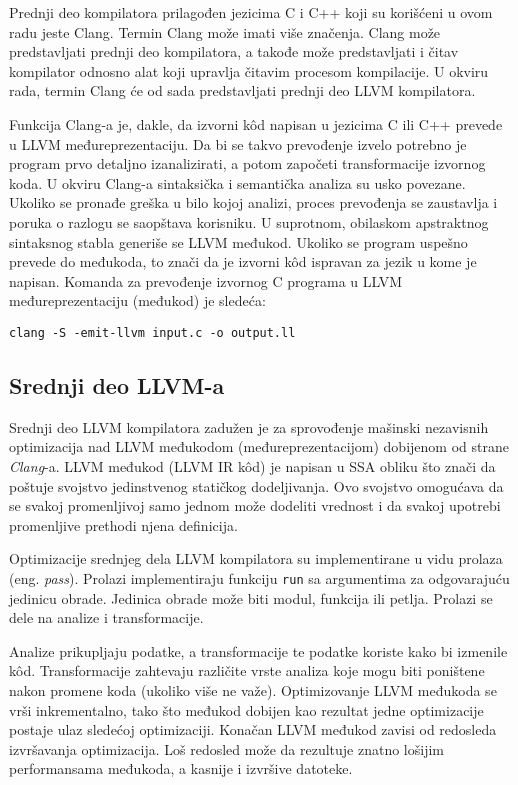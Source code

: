 \documentclass[12pt,oneside]{memoir}
\begin{document}
Prednji deo kompilatora prilagođen jezicima C i C++ koji su korišćeni u ovom radu jeste Clang. Termin Clang može imati više značenja. Clang može predstavljati prednji deo kompilatora, a takođe može predstavljati i čitav kompilator odnosno alat koji upravlja čitavim procesom kompilacije. U okviru rada, termin Clang će od sada predstavljati prednji deo LLVM kompilatora. 

Funkcija Clang-a je, dakle, da izvorni kôd napisan u jezicima C ili C++ prevede u LLVM međureprezentaciju. Da bi se takvo prevođenje izvelo potrebno je program prvo detaljno izanalizirati, a potom započeti transformacije izvornog koda. U okviru Clang-a sintaksička i semantička analiza su usko povezane. Ukoliko se pronađe greška u bilo kojoj analizi, proces prevođenja se zaustavlja i poruka o razlogu se saopštava korisniku. U suprotnom, obilaskom apstraktnog sintaksnog stabla generiše se LLVM međukod. Ukoliko se program uspešno prevede do međukoda, to znači da je izvorni k\^od ispravan za jezik u kome je napisan. Komanda za prevođenje izvornog C programa u LLVM međureprezentaciju (međukod) je sledeća:
\begin{verbatim}
clang -S -emit-llvm input.c -o output.ll
\end{verbatim}

\subsection{Srednji deo LLVM-a}
Srednji deo LLVM kompilatora zadužen je za sprovođenje mašinski nezavisnih optimizacija nad LLVM međukodom (međureprezentacijom) dobijenom od strane \textit{Clang}-a. LLVM međukod (LLVM IR k\^{o}d) je napisan u SSA obliku što znači da poštuje svojstvo jedinstvenog statičkog dodeljivanja. Ovo svojstvo omogućava da se svakoj promenljivoj samo jednom može dodeliti vrednost i da svakoj upotrebi promenljive prethodi njena definicija. 

Optimizacije srednjeg dela LLVM kompilatora su implementirane u vidu prolaza (eng. \textit{pass}). Prolazi implementiraju funkciju \texttt{run} sa argumentima za odgovarajuću jedinicu obrade. Jedinica obrade može biti modul, funkcija ili petlja. Prolazi se dele na analize i transformacije. 

Analize prikupljaju podatke, a transformacije te podatke koriste kako bi izmenile k\^od. 
Transformacije zahtevaju različite vrste analiza koje mogu biti poništene nakon promene koda 
(ukoliko više ne važe). Optimizovanje LLVM međukoda se vrši inkrementalno, tako što međukod dobijen kao rezultat jedne optimizacije postaje ulaz sledećoj optimizaciji. Konačan LLVM međukod zavisi od redosleda izvršavanja optimizacija. Loš redosled može da rezultuje znatno lošijim performansama međukoda, a kasnije i izvršive datoteke.
\end{document}
